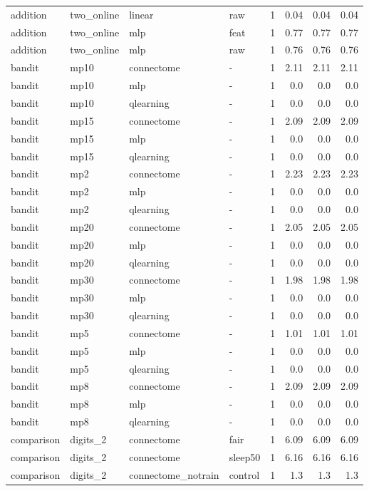 \begin{table}[t]
\begin{tabular}{llllrrrr}
addition & two\_online & linear & raw & 1 & 0.04 & 0.04 & 0.04 \\
addition & two\_online & mlp & feat & 1 & 0.77 & 0.77 & 0.77 \\
addition & two\_online & mlp & raw & 1 & 0.76 & 0.76 & 0.76 \\
bandit & mp10 & connectome & - & 1 & 2.11 & 2.11 & 2.11 \\
bandit & mp10 & mlp & - & 1 & 0.0 & 0.0 & 0.0 \\
bandit & mp10 & qlearning & - & 1 & 0.0 & 0.0 & 0.0 \\
bandit & mp15 & connectome & - & 1 & 2.09 & 2.09 & 2.09 \\
bandit & mp15 & mlp & - & 1 & 0.0 & 0.0 & 0.0 \\
bandit & mp15 & qlearning & - & 1 & 0.0 & 0.0 & 0.0 \\
bandit & mp2 & connectome & - & 1 & 2.23 & 2.23 & 2.23 \\
bandit & mp2 & mlp & - & 1 & 0.0 & 0.0 & 0.0 \\
bandit & mp2 & qlearning & - & 1 & 0.0 & 0.0 & 0.0 \\
bandit & mp20 & connectome & - & 1 & 2.05 & 2.05 & 2.05 \\
bandit & mp20 & mlp & - & 1 & 0.0 & 0.0 & 0.0 \\
bandit & mp20 & qlearning & - & 1 & 0.0 & 0.0 & 0.0 \\
bandit & mp30 & connectome & - & 1 & 1.98 & 1.98 & 1.98 \\
bandit & mp30 & mlp & - & 1 & 0.0 & 0.0 & 0.0 \\
bandit & mp30 & qlearning & - & 1 & 0.0 & 0.0 & 0.0 \\
bandit & mp5 & connectome & - & 1 & 1.01 & 1.01 & 1.01 \\
bandit & mp5 & mlp & - & 1 & 0.0 & 0.0 & 0.0 \\
bandit & mp5 & qlearning & - & 1 & 0.0 & 0.0 & 0.0 \\
bandit & mp8 & connectome & - & 1 & 2.09 & 2.09 & 2.09 \\
bandit & mp8 & mlp & - & 1 & 0.0 & 0.0 & 0.0 \\
bandit & mp8 & qlearning & - & 1 & 0.0 & 0.0 & 0.0 \\
comparison & digits\_2 & connectome & fair & 1 & 6.09 & 6.09 & 6.09 \\
comparison & digits\_2 & connectome & sleep50 & 1 & 6.16 & 6.16 & 6.16 \\
comparison & digits\_2 & connectome\_notrain & control & 1 & 1.3 & 1.3 & 1.3 \\

\end{tabular}
\end{table}
